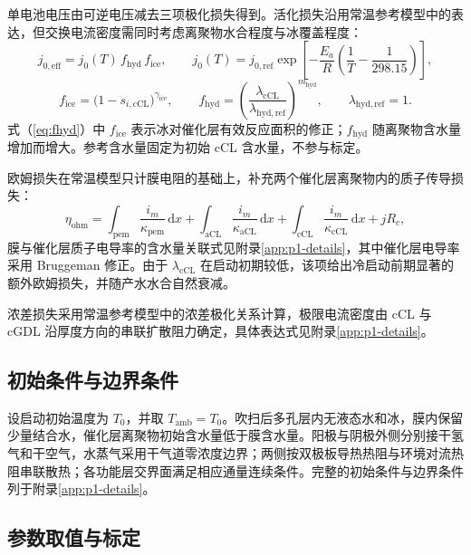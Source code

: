 \documentclass{gmcmthesis}
\begin{document}
单电池电压由可逆电压减去三项极化损失得到。活化损失沿用常温参考模型中的表达，但交换电流密度需同时考虑离聚物水合程度与冰覆盖程度：
\begin{equation}
  j_{0,\mathrm{eff}}=j_0(T)\,f_{\mathrm{hyd}}\,f_{\mathrm{ice}},
  \qquad
  j_0(T)=j_{0,\mathrm{ref}}\exp\!\left[-\frac{E_a}{R}\!\left(\frac{1}{T}-\frac{1}{298.15}\right)\right],
  \label{eq:j0eff}
\end{equation}
\begin{equation}
  f_{\mathrm{ice}}=\bigl(1-s_{i,\mathrm{cCL}}\bigr)^{\gamma_{\mathrm{ice}}},
  \qquad
  f_{\mathrm{hyd}}=\left(\frac{\lambda_{\mathrm{cCL}}}{\lambda_{\mathrm{hyd,ref}}}\right)^{m_{\mathrm{hyd}}},
  \qquad \lambda_{\mathrm{hyd,ref}}=1.
  \label{eq:fhyd}
\end{equation}
式（\ref{eq:fhyd}）中 $f_{\mathrm{ice}}$ 表示冰对催化层有效反应面积的修正；$f_{\mathrm{hyd}}$ 随离聚物含水量增加而增大。参考含水量固定为初始 cCL 含水量，不参与标定。

欧姆损失在常温模型只计膜电阻的基础上，补充两个催化层离聚物内的质子传导损失：
\begin{equation}
  \eta_{\mathrm{ohm}}
  =\int_{\mathrm{pem}}\frac{i_m}{\kappa_{\mathrm{pem}}}\,\mathrm{d}x
  +\int_{\mathrm{aCL}}\frac{i_m}{\kappa_{\mathrm{aCL}}}\,\mathrm{d}x
  +\int_{\mathrm{cCL}}\frac{i_m}{\kappa_{\mathrm{cCL}}}\,\mathrm{d}x
  +jR_c,
  \label{eq:etaohm}
\end{equation}
膜与催化层质子电导率的含水量关联式见附录\ref{app:p1-details}，其中催化层电导率采用 Bruggeman 修正。由于 $\lambda_{\mathrm{cCL}}$ 在启动初期较低，该项给出冷启动前期显著的额外欧姆损失，并随产水水合自然衰减。

浓差损失采用常温参考模型中的浓差极化关系计算，极限电流密度由 cCL 与 cGDL 沿厚度方向的串联扩散阻力确定，具体表达式见附录\ref{app:p1-details}。

\subsection{初始条件与边界条件}

设启动初始温度为 $T_0$，并取 $T_{\mathrm{amb}}=T_0$。吹扫后多孔层内无液态水和冰，膜内保留少量结合水，催化层离聚物初始含水量低于膜含水量。阳极与阴极外侧分别接干氢气和干空气，水蒸气采用干气道零浓度边界；两侧按双极板导热热阻与环境对流热阻串联散热；各功能层交界面满足相应通量连续条件。完整的初始条件与边界条件列于附录\ref{app:p1-details}。

\subsection{参数取值与标定}
\end{document}
